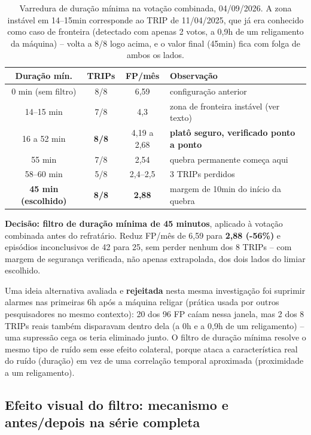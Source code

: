 \documentclass[11pt,a4paper]{article}
\begin{document}
\begin{table}[H]
\centering
\small
\begin{tabular}{cccl}
\toprule
\textbf{Duração mín.} & \textbf{TRIPs} & \textbf{FP/mês} & \textbf{Observação} \\
\midrule
0 min (sem filtro) & 8/8 & 6,59 & configuração anterior \\
14--15 min & 7/8 & 4,3 & zona de fronteira instável (ver texto) \\
16 a 52 min & \textbf{8/8} & 4,19 a 2,68 & \textbf{platô seguro, verificado ponto a ponto} \\
55 min & 7/8 & 2,54 & quebra permanente começa aqui \\
58--60 min & 5/8 & 2,4--2,5 & 3 TRIPs perdidos \\
\midrule
\textbf{45 min (escolhido)} & \textbf{8/8} & \textbf{2,88} & margem de 10min do início da quebra \\
\bottomrule
\end{tabular}
\caption{Varredura de duração mínima na votação combinada, 04/09/2026.
A zona instável em 14--15min corresponde ao TRIP de 11/04/2025, que já
era conhecido como caso de fronteira (detectado com apenas 2 votos, a
0,9h de um religamento da máquina) -- volta a 8/8 logo acima, e o
valor final (45min) fica com folga de ambos os lados.}
\end{table}

\textbf{Decisão: filtro de duração mínima de 45 minutos}, aplicado à
votação combinada antes do refratário. Reduz FP/mês de 6,59 para
\textbf{2,88 (-56\%)} e episódios inconclusivos de 42 para 25, sem
perder nenhum dos 8 TRIPs -- com margem de segurança verificada, não
apenas extrapolada, dos dois lados do limiar escolhido.

Uma ideia alternativa avaliada e \textbf{rejeitada} nesta mesma
investigação foi suprimir alarmes nas primeiras 6h após a máquina
religar (prática usada por outros pesquisadores no mesmo contexto):
20 dos 96 FP caíam nessa janela, mas 2 dos 8 TRIPs reais também
disparavam dentro dela (a 0h e a 0,9h de um religamento) -- uma
supressão cega os teria eliminado junto. O filtro de duração mínima
resolve o mesmo tipo de ruído sem esse efeito colateral, porque ataca
a característica real do ruído (duração) em vez de uma
correlação temporal aproximada (proximidade a um religamento).

\subsection{Efeito visual do filtro: mecanismo e antes/depois na série completa}
\end{document}
